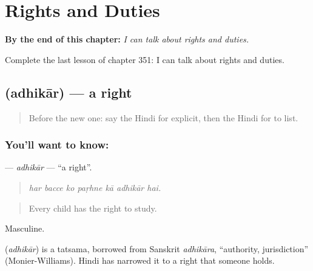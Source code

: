 
\chapter{Rights and Duties}
\label{ch:hi-rights-and-duties}

\begin{chapteropening}
\textbf{By the end of this chapter:} \emph{I can talk about rights and duties.}

Complete the last lesson of chapter 351: I can talk about rights and duties.
\end{chapteropening}

\section[\texorpdfstring{\hi{अधिकार} (adhikār)}{अधिकार (adhikār)}]{ (adhikār) — a right}

\label{lesson:HI-C351-adhikar}



\begin{quote}
Before the new one: say the Hindi for explicit, then the Hindi for to list.
\end{quote}

\subsection*{You'll want to know: }
\textbf{} — \emph{adhikār} — \textquotedblleft{}a right\textquotedblright{}.

\begin{quote}
      
\end{quote}

\begin{quote}
\emph{har bacce ko paṛhne kā adhikār hai.}
\end{quote}

\begin{quote}
Every child has the right to study.
\end{quote}

Masculine.

\begin{cousinweb}
\textbf{} (\emph{adhikār}) is a tatsama, borrowed from Sanskrit \emph{adhikāra}, \textquotedblleft{}authority, jurisdiction\textquotedblright{} (Monier-Williams). Hindi has narrowed it to a right that someone holds.
\end{cousinweb}

